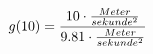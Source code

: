 \documentclass[preview]{standalone}
\begin{document}
\begin{align*}
\special{dvisvgm:raw <g id='unique000'>}g(10) = \frac{10 \cdot \frac{Meter}{sekunde^{2}}}{9.81 \cdot \frac{Meter}{sekunde^{2}}}\special{dvisvgm:raw </g>}
\end{align*}
\end{document}
